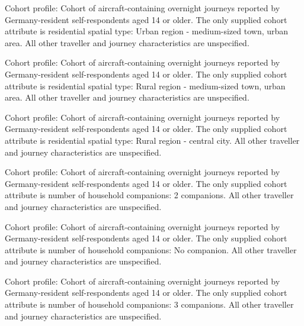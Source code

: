 \begin{promptbox}[title={Residential spatial type: Urban region - medium-sized town, urban area}]
Cohort profile: Cohort of aircraft-containing overnight journeys reported by Germany-resident self-respondents aged 14 or older. The only supplied cohort attribute is residential spatial type: Urban region - medium-sized town, urban area. All other traveller and journey characteristics are unspecified.
\end{promptbox}


\begin{promptbox}[title={Residential spatial type: Rural region - medium-sized town, urban area}]
Cohort profile: Cohort of aircraft-containing overnight journeys reported by Germany-resident self-respondents aged 14 or older. The only supplied cohort attribute is residential spatial type: Rural region - medium-sized town, urban area. All other traveller and journey characteristics are unspecified.
\end{promptbox}


\begin{promptbox}[title={Residential spatial type: Rural region - central city}]
Cohort profile: Cohort of aircraft-containing overnight journeys reported by Germany-resident self-respondents aged 14 or older. The only supplied cohort attribute is residential spatial type: Rural region - central city. All other traveller and journey characteristics are unspecified.
\end{promptbox}


\begin{promptbox}[title={Number of household companions: 2 companions}]
Cohort profile: Cohort of aircraft-containing overnight journeys reported by Germany-resident self-respondents aged 14 or older. The only supplied cohort attribute is number of household companions: 2 companions. All other traveller and journey characteristics are unspecified.
\end{promptbox}


\begin{promptbox}[title={Number of household companions: No companion}]
Cohort profile: Cohort of aircraft-containing overnight journeys reported by Germany-resident self-respondents aged 14 or older. The only supplied cohort attribute is number of household companions: No companion. All other traveller and journey characteristics are unspecified.
\end{promptbox}


\begin{promptbox}[title={Number of household companions: 3 companions}]
Cohort profile: Cohort of aircraft-containing overnight journeys reported by Germany-resident self-respondents aged 14 or older. The only supplied cohort attribute is number of household companions: 3 companions. All other traveller and journey characteristics are unspecified.
\end{promptbox}


